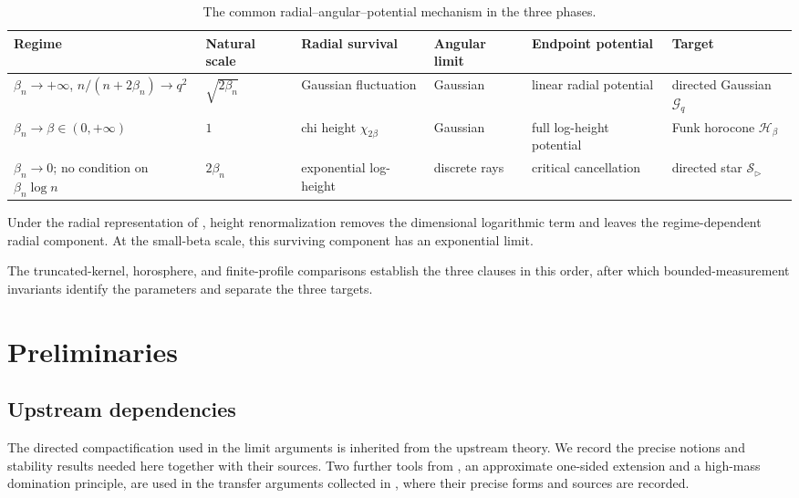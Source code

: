 \documentclass{amsart}
\numberwithin{equation}{section}
\theoremstyle{plain}
\theoremstyle{definition}
\theoremstyle{remark}
\begin{document}
\begin{table}[ht]
\centering
\small
\setlength{\tabcolsep}{2pt}
\renewcommand{\arraystretch}{1.15}
\begin{tabular}{@{}p{}p{}p{}p{}p{}p{}@{}}
\toprule
\raggedright Regime & \raggedright Natural scale & \raggedright Radial survival & \raggedright Angular limit & \raggedright Endpoint potential & \raggedright Target \tabularnewline
\midrule
\raggedright $\beta_n\to+\infty$, $n/(n+2\beta_n)\to q^2$
& \raggedright $\sqrt{2\beta_n}$
& \raggedright Gaussian fluctuation
& \raggedright Gaussian
& \raggedright linear radial potential
& \raggedright directed Gaussian $\mathcal G_q$ \tabularnewline
\raggedright $\beta_n\to\beta\in(0,+\infty)$
& \raggedright $1$
& \raggedright chi height $\chi_{2\beta}$
& \raggedright Gaussian
& \raggedright full log-height potential
& \raggedright Funk horocone $\mathcal H_\beta$ \tabularnewline
\raggedright $\beta_n\to0$; no condition on $\beta_n\log n$
& \raggedright $2\beta_n$
& \raggedright exponential log-height
& \raggedright discrete rays
& \raggedright critical cancellation
& \raggedright directed star $\mathcal S_{\rhd}$ \tabularnewline
\bottomrule
\end{tabular}
\caption{The common radial--angular--potential mechanism in the three phases.}
\label{tab:phase-mechanism}
\end{table}

Under the radial representation of , height renormalization removes the dimensional logarithmic term and leaves the regime-dependent radial component.  At the small-beta scale, this surviving component has an exponential limit.

The truncated-kernel, horosphere, and finite-profile comparisons establish the three clauses in this order, after which bounded-measurement invariants identify the parameters and separate the three targets.

\section{Preliminaries}\label{sec:preliminaries}

\subsection{Upstream dependencies}

The directed compactification used in the limit arguments is inherited from the upstream theory.  We record the precise notions and stability results needed here together with their sources.  Two further tools from \cite{one-sided-pyramids}, an approximate one-sided extension and a high-mass domination principle, are used in the transfer arguments collected in , where their precise forms and sources are recorded.
\end{document}
